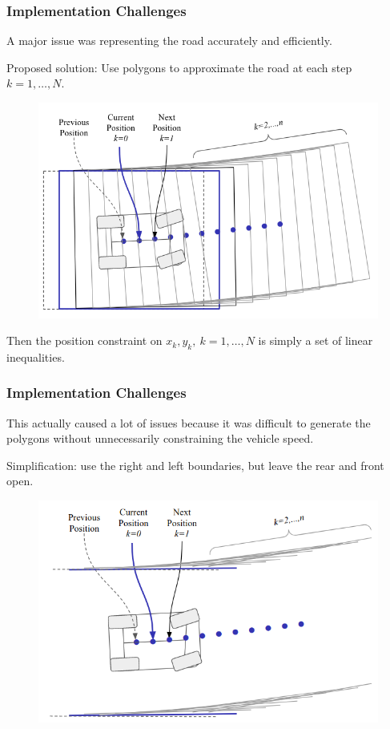 \documentclass{beamer}
\begin{document}
\begin{frame}
\frametitle{Implementation Challenges}
A major issue was representing the road accurately and efficiently.

Proposed solution: Use polygons to approximate the road at each step  $k=1,\dots,N$.
\vspace{-0.5em}
\begin{figure}
\includegraphics[width=0.7\linewidth]{figures/road_polygons.png}
\end{figure}
\vspace{-0.5em}
Then the position constraint on $x_k,y_k,\ k=1,\dots,N$ is simply a set of linear inequalities.
\end{frame}

\begin{frame}
\frametitle{Implementation Challenges}
This actually caused a lot of issues because it was difficult to generate the polygons without unnecessarily constraining the vehicle speed.

Simplification: use the right and left boundaries, but leave the rear and front open.

\vspace{-0.5em}
\begin{figure}
	\includegraphics[width=0.7\linewidth]{figures/road_final_bounds.png}
\end{figure}
\vspace{-0.5em}

\end{frame}
\end{document}
